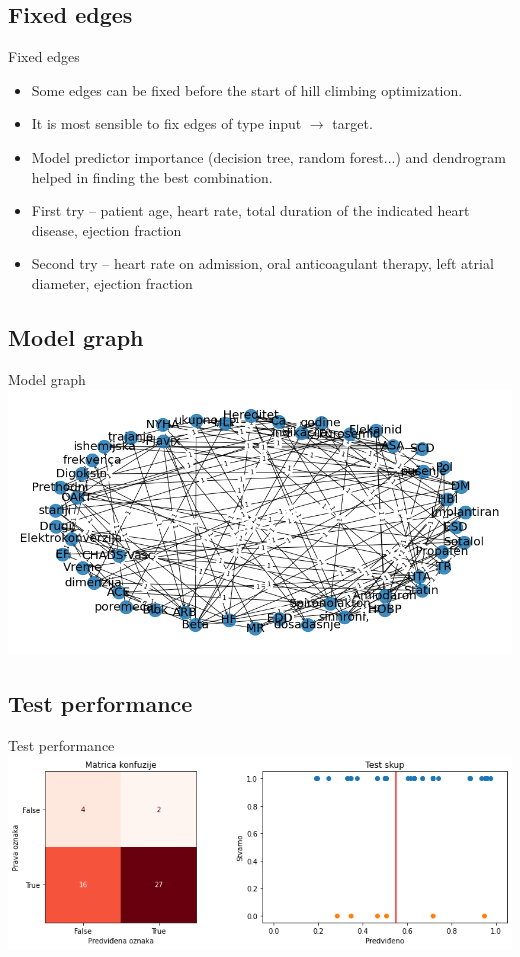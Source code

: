 \documentclass[hyperref={bookmarks=false}]{beamer}
\begin{document}
\subsection{Fixed edges}
\begin{frame}{Fixed edges}
\begin{itemize}
    \item Some edges can be fixed before the start of hill climbing optimization.
    \item It is most sensible to fix edges of type input $\rightarrow$ target.
    \item Model predictor importance (decision tree, random forest...) and dendrogram helped in finding the best combination.
    \item First try -- patient age, heart rate, total duration of the indicated heart disease, ejection fraction
    \item Second try -- heart rate on admission, oral anticoagulant therapy, left atrial diameter, ejection fraction
\end{itemize}
\end{frame}

\subsection{Model graph}
\begin{frame}{Model graph}
\includegraphics[width=\textwidth]{fixed1.png}
\end{frame}

\subsection{Test performance}
\begin{frame}{Test performance}
\includegraphics[width=\textwidth]{fixed2.png}
\end{frame}
\end{document}
